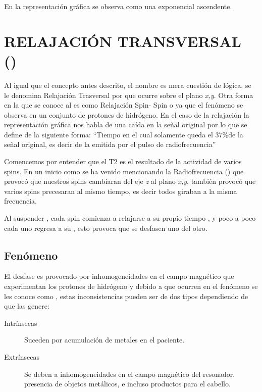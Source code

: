 En la representación gráfica se observa como una exponencial ascendente.



\section{RELAJACIÓN TRANSVERSAL (\Ttwo)}

Al igual que el concepto antes descrito, el nombre es mera cuestión de lógica, se le denomina Relajación Trasversal por que ocurre sobre el plano \textit{x,y}. Otra forma en la que se conoce al \Ttwo es como Relajación Spin- Spin o \Ttwop ya que el fenómeno se observa en un conjunto de protones de hidrógeno. En el caso de la relajación \Ttwop  la representación gráfica nos habla de una caída en la señal original por lo que se define de la siguiente forma:
``Tiempo en el cual solamente queda el 37\%de la señal \Mxy original, es decir de la emitida por el pulso de radiofrecuencia''



Comencemos por entender que el T2 es el resultado de la actividad de varios spins. En un inicio como se ha venido mencionando la Radiofrecuencia (\Mzero) que provocó que nuestros spins cambiaran del eje \textit{z} al plano \textit{x,y}, también provocó que varios spins precesaran al mismo tiempo, es decir todos giraban a la misma frecuencia. 


Al suspender \Mzero, cada spin comienza a relajarse a su propio tiempo , y poco a poco cada uno regresa a su \Mzero, esto provoca que se desfasen uno del otro.


\subsection{Fenómeno \Ttwostar}

El desfase es provocado por inhomogeneidades en el campo magnético que experimentan los protones de hidrógeno y debido a que ocurren en el fenómeno \Ttwo se les conoce como \Ttwostar, estas inconsistencias pueden ser de dos tipos dependiendo de que las genere:

\begin{description}
 \item [Intrínsecas]  Suceden por acumulación de metales en el paciente.
 \item [Extrínsecas]  Se deben a inhomogeneidades en el campo magnético del resonador,  presencia de objetos metálicos, e incluso productos para el cabello.
\end{description}




